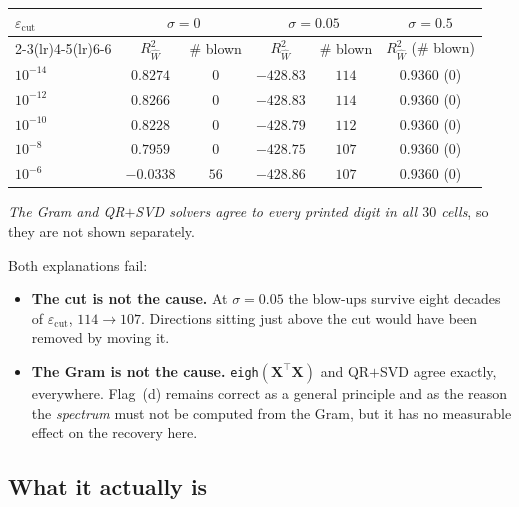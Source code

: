 \documentclass[11pt]{article}
\newcommand{\Mat}[1]{\mathbf{#1}}
\newcommand{\Rw}{R^2_{\widehat W}}
\newcommand{\eps}{\varepsilon}
\begin{document}
\begin{center}
{\footnotesize
\begin{tabular}{lccccc}
\toprule
$\eps_{\mathrm{cut}}$ & \multicolumn{2}{c}{$\sigma=0$}
 & \multicolumn{2}{c}{$\sigma=0.05$} & $\sigma=0.5$ \\
\cmidrule(lr){2-3}\cmidrule(lr){4-5}\cmidrule(lr){6-6}
 & $\Rw$ & \# blown & $\Rw$ & \# blown & $\Rw$ (\# blown) \\
\midrule
$10^{-14}$ & $0.8274$ & $0$  & $-428.83$ & $114$ & $0.9360$ ($0$) \\
$10^{-12}$ & $0.8266$ & $0$  & $-428.83$ & $114$ & $0.9360$ ($0$) \\
$10^{-10}$ & $0.8228$ & $0$  & $-428.79$ & $112$ & $0.9360$ ($0$) \\
$10^{-8}$  & $0.7959$ & $0$  & $-428.75$ & $107$ & $0.9360$ ($0$) \\
$10^{-6}$  & $-0.0338$& $56$ & $-428.86$ & $107$ & $0.9360$ ($0$) \\
\bottomrule
\end{tabular}}

{\footnotesize \emph{The Gram and QR${+}$SVD solvers agree to every printed digit
in all $30$ cells}, so they are not shown separately.}
\end{center}

\noindent Both explanations fail:
\begin{itemize}
\item \textbf{The cut is not the cause.} At $\sigma=0.05$ the blow-ups survive
      eight decades of $\eps_{\mathrm{cut}}$, $114 \to 107$. Directions sitting
      just above the cut would have been removed by moving it.
\item \textbf{The Gram is not the cause.} \texttt{eigh}$(\Mat X^{\!\top}\Mat X)$
      and QR${+}$SVD agree exactly, everywhere. Flag~(d) remains correct as a
      general principle and as the reason the \emph{spectrum} must not be
      computed from the Gram, but it has no measurable effect on the recovery
      here.
\end{itemize}

\subsection{What it actually is}
\end{document}
